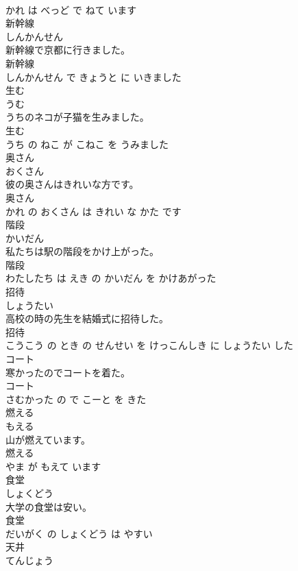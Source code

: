 \documentclass[8pt]{extreport}
\begin{document}
\begin{CJK}{UTF8}{min}
\\	かれ は べっど で ねて います			
\\	新幹線	
\\	しんかんせん			
\\	新幹線で京都に行きました。	
\\	新幹線 
\\	しんかんせん で きょうと に いきました			
\\	生む	
\\	うむ			
\\	うちのネコが子猫を生みました。	
\\	生む 
\\	うち の ねこ が こねこ を うみました			
\\	奥さん	
\\	おくさん			
\\	彼の奥さんはきれいな方です。	
\\	奥さん 
\\	かれ の おくさん は きれい な かた です			
\\	階段	
\\	かいだん			
\\	私たちは駅の階段をかけ上がった。	
\\	階段 
\\	わたしたち は えき の かいだん を かけあがった			
\\	招待	
\\	しょうたい			
\\	高校の時の先生を結婚式に招待した。	
\\	招待 
\\	こうこう の とき の せんせい を けっこんしき に しょうたい した			
\\	コート	
\\	寒かったのでコートを着た。	
\\	コート 
\\	さむかった の で こーと を きた			
\\	燃える	
\\	もえる			
\\	山が燃えています。	
\\	燃える 
\\	やま が もえて います			
\\	食堂	
\\	しょくどう			
\\	大学の食堂は安い。	
\\	食堂 
\\	だいがく の しょくどう は やすい			
\\	天井	
\\	てんじょう			

\end{CJK}
\end{document}

